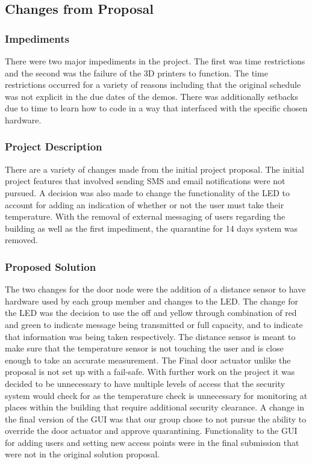 \subsection{Changes from Proposal}


\subsubsection{Impediments}

There were two major impediments in the project. The first was time restrictions and the second was the failure of the 3D printers to function. The time restrictions occurred for a variety of reasons including that the original schedule was not explicit in the due dates of the demos. There was additionally setbacks due to time to learn how to code in a way that interfaced with the specific chosen hardware.

\subsubsection{Project Description}

There are a variety of changes made from the initial project proposal. The initial project features that involved sending SMS and email notifications were not pursued. A decision was also made to change the functionality of the LED to account for adding an indication of whether or not the user must take their temperature. With the removal of external messaging of users regarding the building as well as the first impediment, the quarantine for 14 days system was removed.

\subsubsection{Proposed Solution}

The two changes for the door node were the addition of a distance sensor to have hardware used by each group member and changes to the LED. The change for the LED was the decision to use the off and yellow through combination of red and green to indicate message being transmitted or full capacity, and to indicate that information was being taken respectively. The distance sensor is meant to make sure that the temperature sensor is not touching the user and is close enough to take an accurate measurement. The Final door actuator unlike the proposal is not set up with a fail-safe. With further work on the project it was decided to be unnecessary to have multiple levels of access that the security system would check for as the temperature check is unnecessary for monitoring at places within the building that require additional security clearance. A change in the final version of the GUI was that our group chose to not pursue the ability to override the door actuator and approve quarantining. Functionality to the GUI for adding users and setting new access points were in the final submission that were not in the original solution proposal.

